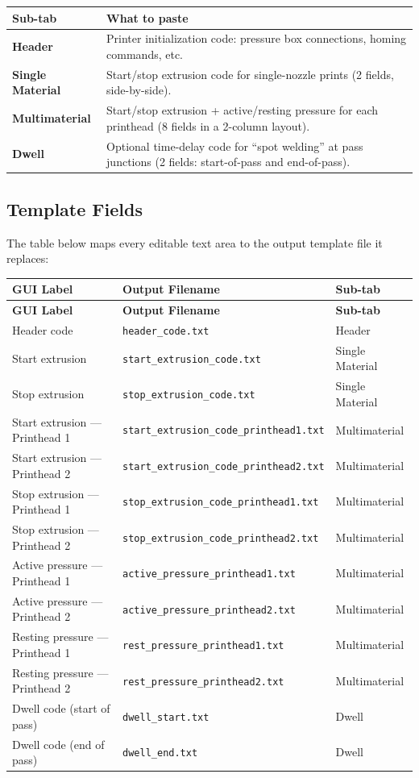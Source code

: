 \documentclass[11pt,letterpaper]{article}
\newcommand{\code}[1]{\texttt{#1}}
\newcommand{\gui}[1]{\textcolor{guicolor}{\textsf{\textbf{#1}}}}
\begin{document}
\begin{tabularx}{\textwidth}{l X}
\toprule
\textbf{Sub-tab} & \textbf{What to paste} \\
\midrule
\gui{Header} & Printer initialization code: pressure box connections, homing commands, etc. \\
\gui{Single Material} & Start/stop extrusion code for single-nozzle prints (2 fields, side-by-side). \\
\gui{Multimaterial} & Start/stop extrusion + active/resting pressure for each printhead (8 fields in a 2-column layout). \\
\gui{Dwell} & Optional time-delay code for ``spot welding'' at pass junctions (2 fields: start-of-pass and end-of-pass). \\
\bottomrule
\end{tabularx}

\subsection{Template Fields}

The table below maps every editable text area to the output template file it
replaces:

\begin{longtable}{L{4.5cm} L{5.5cm} l}
\toprule
\textbf{GUI Label} & \textbf{Output Filename} & \textbf{Sub-tab} \\
\midrule
\endfirsthead
\toprule
\textbf{GUI Label} & \textbf{Output Filename} & \textbf{Sub-tab} \\
\midrule
\endhead
Header code & \code{header\_code.txt} & Header \\
Start extrusion & \code{start\_extrusion\_code.txt} & Single Material \\
Stop extrusion & \code{stop\_extrusion\_code.txt} & Single Material \\
Start extrusion --- Printhead 1 & \code{start\_extrusion\_code\_printhead1.txt} & Multimaterial \\
Start extrusion --- Printhead 2 & \code{start\_extrusion\_code\_printhead2.txt} & Multimaterial \\
Stop extrusion --- Printhead 1 & \code{stop\_extrusion\_code\_printhead1.txt} & Multimaterial \\
Stop extrusion --- Printhead 2 & \code{stop\_extrusion\_code\_printhead2.txt} & Multimaterial \\
Active pressure --- Printhead 1 & \code{active\_pressure\_printhead1.txt} & Multimaterial \\
Active pressure --- Printhead 2 & \code{active\_pressure\_printhead2.txt} & Multimaterial \\
Resting pressure --- Printhead 1 & \code{rest\_pressure\_printhead1.txt} & Multimaterial \\
Resting pressure --- Printhead 2 & \code{rest\_pressure\_printhead2.txt} & Multimaterial \\
Dwell code (start of pass) & \code{dwell\_start.txt} & Dwell \\
Dwell code (end of pass) & \code{dwell\_end.txt} & Dwell \\
\bottomrule
\end{longtable}
\end{document}
